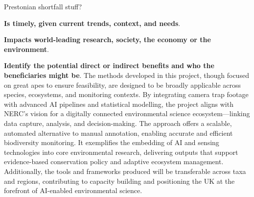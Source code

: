 Prestonian shortfall stuff?

\textbf{Is timely, given current trends, context, and needs}.

\textbf{Impacts world-leading research, society, the economy or the environment}.

\textbf{Identify the potential direct or indirect benefits and who the beneficiaries might be}. The methods developed in this project, though focused on great apes to ensure feasibility, are designed to be broadly applicable across species, ecosystems, and monitoring contexts. By integrating camera trap footage with advanced AI pipelines and statistical modelling, the project aligns with NERC’s vision for a digitally connected environmental science ecosystem—linking data capture, analysis, and decision-making. The approach offers a scalable, automated alternative to manual annotation, enabling accurate and efficient biodiversity monitoring. It exemplifies the embedding of AI and sensing technologies into core environmental research, delivering outputs that support evidence-based conservation policy and adaptive ecosystem management. Additionally, the tools and frameworks produced will be transferable across taxa and regions, contributing to capacity building and positioning the UK at the forefront of AI-enabled environmental science.


